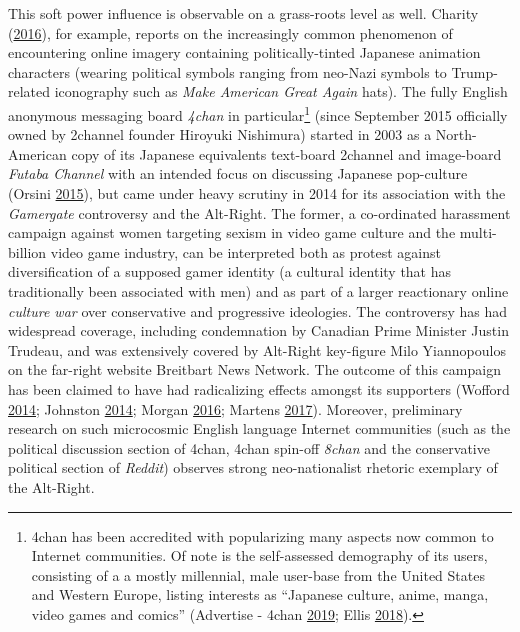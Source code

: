 \documentclass[10pt,british,A4paper,oneside]{memoir}
\begin{document}
This soft power influence is observable on a grass-roots level as well.
Charity (\protect\hyperlink{ref-charity_why_2016}{2016}), for example,
reports on the increasingly common phenomenon of encountering online
imagery containing politically-tinted Japanese animation characters
(wearing political symbols ranging from neo-Nazi symbols to
Trump-related iconography such as \emph{Make American Great Again}
hats). The fully English anonymous messaging board \emph{4chan} in
particular\footnote{4chan has been accredited with popularizing many
  aspects now common to Internet communities. Of note is the
  self-assessed demography of its users, consisting of a a mostly
  millennial, male user-base from the United States and Western Europe,
  listing interests as ``Japanese culture, anime, manga, video games and
  comics'' (Advertise - 4chan
  \protect\hyperlink{ref-noauthor_advertise_nodate}{2019}; Ellis
  \protect\hyperlink{ref-ellis_4chan_2018}{2018}).} (since September
2015 officially owned by 2channel founder Hiroyuki Nishimura) started in
2003 as a North-American copy of its Japanese equivalents text-board
2channel and image-board \emph{Futaba Channel} with an intended focus on
discussing Japanese pop-culture (Orsini
\protect\hyperlink{ref-orsini_how_2015}{2015}), but came under heavy
scrutiny in 2014 for its association with the \emph{Gamergate}
controversy and the Alt-Right. The former, a co-ordinated harassment
campaign against women targeting sexism in video game culture and the
multi-billion video game industry, can be interpreted both as protest
against diversification of a supposed gamer identity (a cultural
identity that has traditionally been associated with men) and as part of
a larger reactionary online \emph{culture war} over conservative and
progressive ideologies. The controversy has had widespread coverage,
including condemnation by Canadian Prime Minister Justin Trudeau, and
was extensively covered by Alt-Right key-figure Milo Yiannopoulos on the
far-right website Breitbart News Network. The outcome of this campaign
has been claimed to have had radicalizing effects amongst its supporters
(Wofford \protect\hyperlink{ref-wofford_is_2014}{2014}; Johnston
\protect\hyperlink{ref-johnston_chat_2014}{2014}; Morgan
\protect\hyperlink{ref-morgan_analysis_2016}{2016}; Martens
\protect\hyperlink{ref-martens_rally_2017}{2017}). Moreover, preliminary
research on such microcosmic English language Internet communities (such
as the political discussion section of 4chan, 4chan spin-off
\emph{8chan} and the conservative political section of \emph{Reddit})
observes strong neo-nationalist rhetoric exemplary of the Alt-Right.
\end{document}
